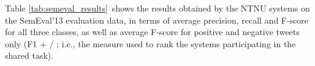 Table \ref{tab:semeval_results}~shows the results obtained by the NTNU systems on the SemEval'13 evaluation data, in terms of average precision, recall and F-score for all three classes, as well as average F-score for positive and negative tweets only (F1 + / \textendash; i.e., the measure used to rank the systems participating in the shared task).
